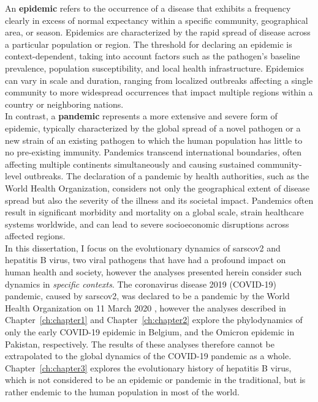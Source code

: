 An \textbf{epidemic} refers to the occurrence of a disease that exhibits a frequency clearly in excess of normal expectancy within a specific community, geographical area, or season.
Epidemics are characterized by the rapid spread of disease across a particular population or region.
The threshold for declaring an epidemic is context-dependent, taking into account factors such as the pathogen's baseline prevalence, population susceptibility, and local health infrastructure.
Epidemics can vary in scale and duration, ranging from localized outbreaks affecting a single community to more widespread occurrences that impact multiple regions within a country or neighboring nations.\\

In contrast, a \textbf{pandemic} represents a more extensive and severe form of epidemic, typically characterized by the global spread of a novel pathogen or a new strain of an existing pathogen to which the human population has little to no pre-existing immunity.
Pandemics transcend international boundaries, often affecting multiple continents simultaneously and causing sustained community-level outbreaks.
The declaration of a pandemic by health authorities, such as the World Health Organization, considers not only the geographical extent of disease spread but also the severity of the illness and its societal impact.
Pandemics often result in significant morbidity and mortality on a global scale, strain healthcare systems worldwide, and can lead to severe socioeconomic disruptions across affected regions.\\

In this dissertation, I focus on the evolutionary dynamics of \gls{sarscov2} and hepatitis B virus, two viral pathogens that have had a profound impact on human health and society, however the analyses presented herein consider such dynamics in \textit{specific contexts}.
The coronavirus disease 2019 (COVID-19) pandemic, caused by \gls{sarscov2}, was declared to be a pandemic by the World Health Organization on 11 March 2020 \citep{who_pandemic}, however the analyses described in Chapter~\ref{ch:chapter1} and Chapter~\ref{ch:chapter2} explore the phylodynamics of only the early COVID-19 epidemic in Belgium, and the Omicron epidemic in Pakistan, respectively.
The results of these analyses therefore cannot be extrapolated to the global dynamics of the COVID-19 pandemic as a whole.
Chapter~\ref{ch:chapter3} explores the evolutionary history of hepatitis B virus, which is not considered to be an epidemic or pandemic in the traditional, but is rather endemic to the human population in most of the world.\\

